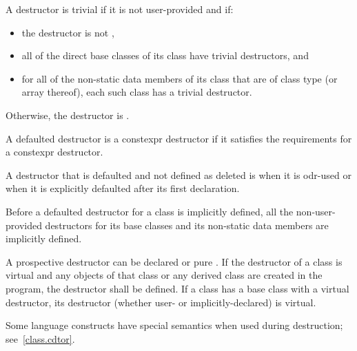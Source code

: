 \pnum
A destructor is trivial if it is not user-provided and if:
\begin{itemize}
\item the destructor is not ,

\item all of the direct base classes of its class have trivial destructors, and

\item for all of the non-static data members of its class that are of class
type (or array thereof), each such class has a trivial destructor.
\end{itemize}

Otherwise, the destructor is
.

\pnum
A defaulted destructor is a constexpr destructor
if it satisfies the requirements for a constexpr destructor.

\pnum
A destructor
that is defaulted and not defined as deleted
is
when it is odr-used
or when it is explicitly defaulted after its first declaration.

\pnum
Before a
defaulted destructor for a class is implicitly defined, all the non-user-provided
destructors for its base classes and its non-static data members are
implicitly defined.

\pnum
{}%
%
A prospective destructor can be declared
or pure
.
If the destructor of a class is virtual and
any objects of that class or any derived class are created in the program,
the destructor shall be defined.
If a class has a base class with a virtual destructor, its  destructor
(whether user- or implicitly-declared) is virtual.

\pnum
\begin{note}
%
Some language constructs have special semantics when used during destruction;
see~\ref{class.cdtor}.
\end{note}

